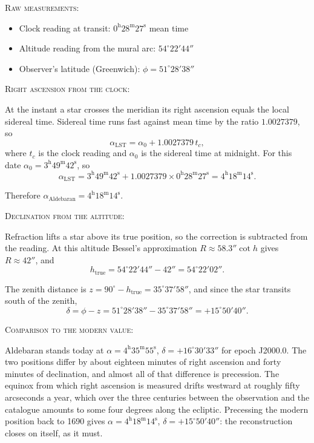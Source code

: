 \textsc{Raw measurements:}
\begin{itemize}
  \item Clock reading at transit: $0^{\text{h}} 28^{\text{m}} 27^{\text{s}}$ mean time
  \item Altitude reading from the mural arc: $54^\circ 22' 44''$
  \item Observer's latitude (Greenwich): $\phi = 51^\circ 28' 38''$
\end{itemize}

\textsc{Right ascension from the clock:}

At the instant a star crosses the meridian its right ascension equals the local sidereal time. Sidereal time runs fast against mean time by the ratio $1.0027379$, so
\[
\alpha_{\text{LST}} = \alpha_0 + 1.0027379 \, t_c,
\]
where $t_c$ is the clock reading and $\alpha_0$ is the sidereal time at midnight. For this date $\alpha_0 = 3^{\text{h}} 49^{\text{m}} 42^{\text{s}}$, so
\[
\alpha_{\text{LST}} = 3^{\text{h}} 49^{\text{m}} 42^{\text{s}} + 1.0027379 \times 0^{\text{h}} 28^{\text{m}} 27^{\text{s}} = 4^{\text{h}} 18^{\text{m}} 14^{\text{s}}.
\]

Therefore $\alpha_{\text{Aldebaran}} = 4^{\text{h}} 18^{\text{m}} 14^{\text{s}}$.

\textsc{Declination from the altitude:}

Refraction lifts a star above its true position, so the correction is subtracted from the reading. At this altitude Bessel's approximation $R \approx 58.3'' \cot h$ gives $R \approx 42''$, and
\[
h_{\text{true}} = 54^\circ 22' 44'' - 42'' = 54^\circ 22' 02''.
\]

The zenith distance is $z = 90^\circ - h_{\text{true}} = 35^\circ 37' 58''$, and since the star transits south of the zenith,
\[
\delta = \phi - z = 51^\circ 28' 38'' - 35^\circ 37' 58'' = +15^\circ 50' 40''.
\]

\textsc{Comparison to the modern value:}

Aldebaran stands today at $\alpha = 4^{\text{h}} 35^{\text{m}} 55^{\text{s}}$, $\delta = +16^\circ 30' 33''$ for epoch J2000.0. The two positions differ by about eighteen minutes of right ascension and forty minutes of declination, and almost all of that difference is precession. The equinox from which right ascension is measured drifts westward at roughly fifty arcseconds a year, which over the three centuries between the observation and the catalogue amounts to some four degrees along the ecliptic. Precessing the modern position back to 1690 gives $\alpha = 4^{\text{h}} 18^{\text{m}} 14^{\text{s}}$, $\delta = +15^\circ 50' 40''$: the reconstruction closes on itself, as it must.

